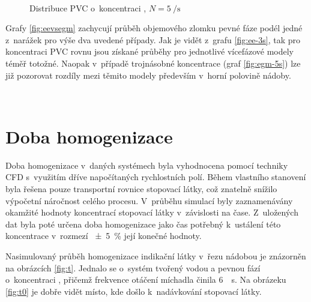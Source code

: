 \begin{figure}[h!]
 \centering
  \qquad 
  \\
  \caption{Distribuce PVC o~koncentraci , $N=\SI{5}{\per\second}$}
  \label{fig:w15}
\end{figure}


Grafy \ref{fig:eevsegm} zachycují průběh objemového zlomku pevné fáze podél jedné z~narážek pro výše dva uvedené případy. Jak je vidět z~grafu \ref{fig:ee-3s}, tak pro koncentraci PVC rovnu  jsou získané průběhy pro jednotlivé vícefázové modely téměř totožné. Naopak v~případě trojnásobné koncentrace (graf \ref{fig:egm-5s}) lze již pozorovat rozdíly mezi těmito modely především v~horní polovině nádoby. 


\begin{grf}[h!]
 \centering
  \\ 
  \caption{Průběh objemového zlomku pevné fáze, \pvpS}
  \label{fig:eevsegm}
\end{grf}
\newpage

\section{Doba homogenizace}
Doba homogenizace v~daných systémech byla vyhodnocena pomocí techniky CFD s~využitím dříve napočítaných rychlostních polí. Během vlastního stanovení byla řešena pouze transportní rovnice stopovací látky, což znatelně snížilo výpočetní náročnost celého procesu. V~průběhu simulací byly zaznamenávány okamžité hodnoty koncentrací stopovací látky v~závislosti na čase. Z~uložených dat byla poté určena doba homogenizace jako čas potřebný k~ustálení této koncentrace v~rozmezí \SI{\pm 5}{\percent} její konečné hodnoty.

Nasimulovaný průběh homogenizace indikační látky v~řezu nádobou je znázorněn na obrázcích \ref{fig:t}. Jednalo se o~systém tvořený vodou a pevnou fází o~koncentraci , přičemž frekvence otáčení míchadla činila \SI{6}{\per\second}. Na obrázeku \ref{fig:t0} je dobře vidět místo, kde došlo k~nadávkování stopovací látky.

